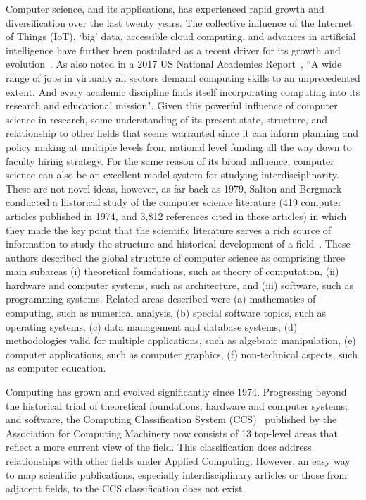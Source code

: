 Computer science, and its applications, has experienced rapid growth and diversification over the last twenty years. The collective influence of the Internet of Things (IoT), `big' data, accessible cloud computing, and advances in artificial intelligence have further been postulated as a recent driver for its growth and evolution~\cite{siebel2019_digital}. As also noted in a 2017 US National Academies Report~\cite{nas_2017}, ``A wide range of jobs in virtually all sectors demand computing skills to an unprecedented extent. And every academic discipline finds itself incorporating computing into its research and educational mission". Given this powerful influence of computer science in research, some understanding of its present state, structure, and relationship to other fields that seems warranted since it can inform planning and policy making at multiple levels from national level funding all the way down to faculty hiring strategy. For the same reason of its broad influence, computer science can also be an excellent model system for studying interdisciplinarity. These are not novel ideas, however, as far back as 1979, Salton and Bergmark conducted a historical study of the computer science literature (419 computer articles published in 1974,  and 3,812 references cited in these articles) in which they made the key point that the scientific literature serves a rich source of information to study the structure and historical development of a field~\cite{salton_citation_1979}. These authors described the global structure of computer science as comprising three main subareas (i) theoretical foundations, such as theory of computation, (ii) hardware and computer systems, such as architecture,  and (iii) software, such as programming systems.  Related areas described were  (a) mathematics of computing, such as numerical analysis, (b) special software topics, such as operating systems, (c) data management and database systems, (d) methodologies valid for multiple applications, such as algebraic manipulation, (e) computer applications, such as computer graphics, (f) non-technical aspects, such as computer education. 

Computing has grown and evolved significantly since 1974. Progressing beyond the historical triad of theoretical foundations; hardware and computer systems; and software\cite{salton_citation_1979}, the Computing Classification System (CCS)~\cite{acm_ref} published by the Association for Computing Machinery now consists of 13 top-level areas that reflect a more current view of the field. This classification does address relationships with other fields under Applied Computing. However, an easy way to map scientific publications, especially interdisciplinary articles or those from adjacent fields, to the CCS classification does not exist. 

